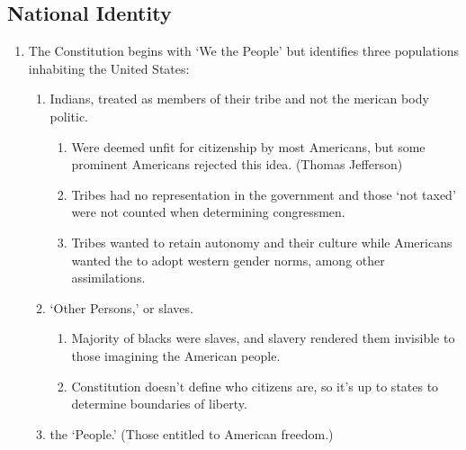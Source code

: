 \documentclass{article}
\begin{document}
    \subsection{National Identity}
      \begin{enumerate}
        \item The Constitution begins with `We the People' but identifies three populations inhabiting the United States:
          \begin{enumerate}
            \item Indians, treated as members of their tribe and not the merican body politic.
              \begin{enumerate}
                \item Were deemed unfit for citizenship by most Americans, but some prominent Americans rejected this idea. (Thomas Jefferson)
                \item Tribes had no representation in the government and those `not taxed' were not counted when determining congressmen.
                \item Tribes wanted to retain autonomy and their culture while Americans wanted the to adopt western gender norms, among other assimilations.
              \end{enumerate}
            \item `Other Persons,' or slaves.
              \begin{enumerate}
                \item Majority of blacks were slaves, and slavery rendered them invisible to those imagining the American people.
                \item Constitution doesn't define who citizens are, so it's up to states to determine boundaries of liberty.
              \end{enumerate}
            \item the `People.' (Those entitled to American freedom.)
          \end{enumerate}
      \end{enumerate}
\end{document}
